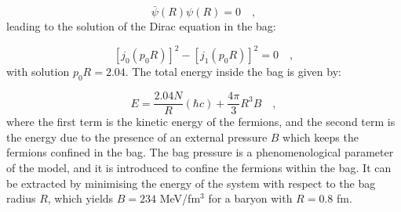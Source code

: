 \begin{equation*}
    \bar{\psi}(R)\psi(R) = 0\quad ,
\end{equation*}
leading to the solution of the Dirac equation in the bag:

\begin{equation*}
    \left[j_0\left(p_0R\right)\right]^2 - \left[j_1\left(p_0R\right)\right]^2 = 0\quad ,
\end{equation*}
with solution $p_0R = 2.04$. The total energy inside the bag is given by:

\begin{equation*}
    E = \frac{2.04 N}{R}(\hbar c) + \frac{4\pi}{3}R^3B\quad ,
\end{equation*}
where the first term is the kinetic energy of the fermions, and the second term is the energy due to the presence of an external pressure $B$ which keeps the fermions confined in the bag. The bag pressure is a phenomenological parameter of the model, and it is introduced to confine the fermions within the bag. It can be extracted by minimising the energy of the system with respect to the bag radius $R$, which yields $B=234$ MeV/fm$^3$ for a baryon with $R=0.8$ fm.


